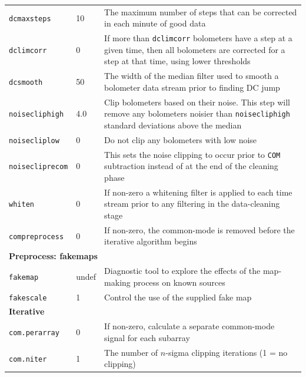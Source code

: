 \documentclass[twoside,11pt]{article}
\renewcommand{\_}{\texttt{\symbol{95}}}
\newcommand{\param}[1]{\texttt{#1}}
\newcommand{\model}[1]{\texttt{#1}}
\begin{document}
\begin{htmlonly}
\begin{table}
\begin{center}
\begin{small}
\begin{tabular}{|p{2.2cm}|p{1.1cm}|p{11.4cm}|}
\param{dcmaxsteps}    &   10 & The maximum number of steps that can be corrected
                               in each minute of good data \\
\param{dclimcorr}     &    0 & If more than \param{dclimcorr} bolometers have a step
                               at a given time, then all bolometers are corrected
                               for a step at that time, using lower thresholds \\
\param{dcsmooth}      &   50 & The width of the median filter used to smooth a
                               bolometer data stream prior to finding DC jump \\
\param{noisecliphigh} &  4.0 & Clip bolometers based on their noise. This step
                               will remove any bolometers noisier than
                               \param{noisecliphigh} standard deviations above the
                               median \\
\param{noisecliplow}   &   0 & Do not clip any bolometers with low noise \\
\param{noisecliprecom} &   0 & This sets the noise clipping to occur prior to
                               \model{COM} subtraction instead of at the end of
                               the cleaning phase \\
\param{whiten}         &   0 & If non-zero a whitening filter is applied to each
                               time stream prior to any filtering in the
                               data-cleaning stage \\
\param{compreprocess}  &   0 & If non-zero, the common-mode is removed before the
                               iterative algorithm begins \\
\hline
\multicolumn{3}{|l|}{\textbf{Preprocess: fakemaps}}\\
\hline
\param{fakemap}         & undef & Diagnostic tool to explore the effects of the
                                  map-making process on known sources \\
\param{fakescale}       &     1 & Control the use of the supplied fake map \\
\hline
\multicolumn{3}{|l|}{\textbf{Iterative}}\\
\hline
\param{com.perarray}     &      0 & If non-zero, calculate a separate common-mode
                                    signal for each subarray \\
\param{com.niter}        &      1 & The number of $n$-sigma clipping iterations
                                    (1 = no clipping) \\

\end{tabular}
\end{small}
\end{center}
\end{table}
\end{htmlonly}
\end{document}
